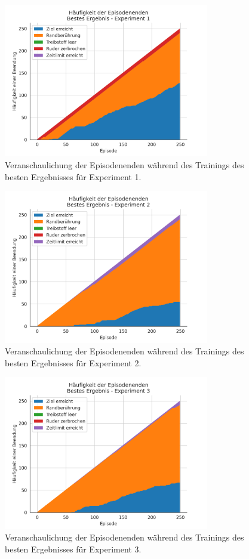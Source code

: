 \documentclass[]{iat}
\begin{document}
\begin{figure}[H]
    \includegraphics[width=0.8\textwidth]{graphics/stacked_best/stacked_plot_bs1.png}
    \centering
    \caption{Veranschaulichung der Episodenenden während des Trainings des besten Ergebnisses für Experiment 1.}
    \label{abb:stacked_plot_bs1}
\end{figure}
\begin{figure}[H]
    \includegraphics[width=0.8\textwidth]{graphics/stacked_best/stacked_plot_bs2.png}
    \centering
    \caption{Veranschaulichung der Episodenenden während des Trainings des besten Ergebnisses für Experiment 2.}
    \label{abb:stacked_plot_bs2}
\end{figure}
\begin{figure}[H]
    \includegraphics[width=0.8\textwidth]{graphics/stacked_best/stacked_plot_bs3.png}
    \centering
    \caption{Veranschaulichung der Episodenenden während des Trainings des besten Ergebnisses für Experiment 3.}
    \label{abb:stacked_plot_bs3}
\end{figure}
\end{document}

